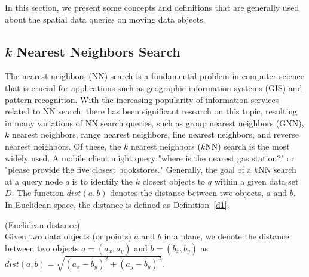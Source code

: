 In this section, we present some concepts and definitions that are generally used about the spatial data queries on moving data objects. 

\subsection{\textit{k} Nearest Neighbors Search}
The nearest neighbors (NN) search is a fundamental problem in computer science that is crucial for applications such as geographic information systems (GIS) and pattern recognition. With the increasing popularity of information services related to NN search, there has been significant research on this topic, resulting in many variations of NN search queries, such as group nearest neighbors (GNN), $k$ nearest neighbors, range nearest neighbors, line nearest neighbors, and reverse nearest neighbors. Of these, the $k$ nearest neighbors ($k$NN) search is the most widely used. A mobile client might query "where is the nearest gas station?" or "please provide the five closest bookstores." Generally, the goal of a $k$NN search at a query node $q$ is to identify the $k$ closest objects to $q$ within a given data set $D$. The function $dist(a, b)$ denotes the distance between two objects, $a$ and $b$. In Euclidean space, the distance is defined as Definition~\ref{d1}.
%
\begin{defi}
	\label{d1}(Euclidean distance)\\
	Given two data objects (or points) $a$ and $b$ in a plane, we denote the distance between two objects $a=(a_x,a_y)$ and $b=(b_x,b_y)$ as
	$dist(a,b)=\sqrt{(a_x-b_y)^2+(a_y-b_y)^2}$.
\end{defi}

\clearpage